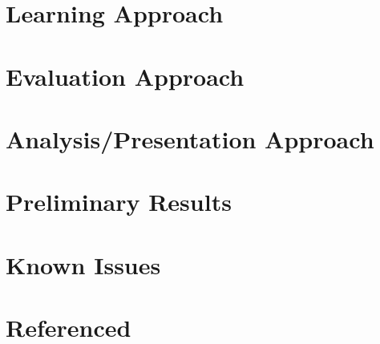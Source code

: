 \documentclass[12pt]{article}
\begin{document}
\section{Learning Approach}
\section{Evaluation Approach}
\section{Analysis/Presentation Approach}
\section{Preliminary Results}
\section{Known Issues}
\section{Referenced}
\end{document}
